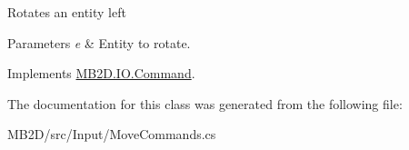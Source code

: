 Rotates an entity left 


\begin{DoxyParams}{Parameters}
{\em e} & Entity to rotate.\\
\hline
\end{DoxyParams}


Implements \hyperlink{class_m_b2_d_1_1_i_o_1_1_command_ae927e36c0e285848325cc68eddb5fd72}{M\+B2\+D.\+I\+O.\+Command}.



The documentation for this class was generated from the following file\+:\begin{DoxyCompactItemize}
\item 
M\+B2\+D/src/\+Input/Move\+Commands.\+cs\end{DoxyCompactItemize}

